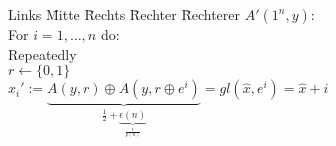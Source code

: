 \begin{tabbing}
    Links \= Mitte \= Rechts \= Rechter \= Rechterer \kill
    $A'(1^n,y)$:\\
    \> For $i = 1,\dots,n$ do:\\
    \> \> Repeatedly\\
    \> \> \> $r \leftarrow \{0,1\}$\\
    \> \> \> $x_i' := \underbrace{A(y,r)\oplus A(y,r\oplus e^i)}_{\frac{1}{2}+\underbrace{\epsilon(n)}_{\frac{1}{p(n)}}} = gl(\hat x, e^i)= \hat x+i$\\
\end{tabbing}
